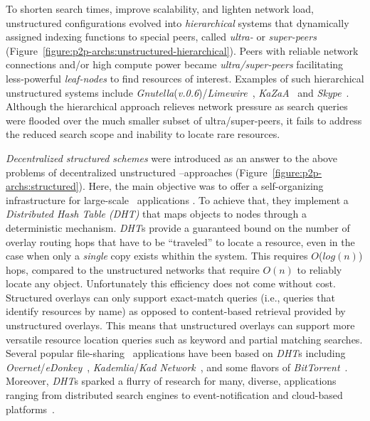 
To shorten search times, improve scalability, and lighten network load, 
unstructured configurations evolved into \emph{hierarchical} systems 
that dynamically assigned indexing functions to special peers, 
called \emph{ultra-}  or \emph{super-peers} 
(Figure~\ref{figure:p2p-archs:unstructured-hierarchical}). 
Peers with reliable network connections and/or high compute power 
became \emph{ultra/super-peers}
facilitating less-powerful \emph{leaf-nodes} to find resources of
interest. 
Examples of such hierarchical unstructured systems include
{\sl Gnutella}(\emph{v.0.6})/{\sl Limewire}~\cite{gnutella}, 
{\sl KaZaA}~\cite{kazaa} and {\sl Skype}~\cite{skype}. 
Although the hierarchical approach relieves network pressure as
search queries were flooded over the much smaller subset of 
ultra/super-peers, it fails to address the reduced search scope and
inability to locate rare resources.

\emph{Decentralized structured schemes} were introduced as an answer to the above
problems of decentralized unstructured \p--approaches
(Figure~\ref{figure:p2p-archs:structured}).
Here, the main objective was to offer 
a self-organizing infrastructure for large-scale \p\ applications
\cite{ratnasamy_can_2001,stoica_chord_2001,antony_pastry_2001,zhao_tapestry_2001,maymounkov_kademlia_2002,rgrk_bamboo_2004}.
To achieve that, they implement a \emph{Distributed Hash Table (DHT)} that maps
objects to nodes through a deterministic mechanism. \emph{DHT}s provide a
guaranteed bound on the number of overlay routing hops that have to be
``traveled'' to locate a resource, even in the case when only a \emph{single}
copy exists whithin the system. This requires
$O$($log(n)$) hops, compared to the unstructured networks that require
$O(n)$ to reliably locate any object. Unfortunately this efficiency does not
come without cost. Structured overlays can only support exact-match queries 
(i.e., queries that identify resources by name) as opposed
to content-based retrieval provided by unstructured overlays. 
This means that unstructured overlays can support more versatile 
resource location queries such as keyword and partial matching searches. 
Several popular file-sharing \p\ applications have been based on \emph{DHT}s
including {\sl Overnet}/{\sl eDonkey}~\cite{overnet}, 
{\sl Kademlia}/{\sl Kad Network}~\cite{maymounkov_kademlia_2002},  and 
some flavors of {\sl BitTorrent}~\cite{c_bittorrent_2003}.  
Moreover, \emph{DHT}s sparked
a flurry of research for many, diverse, applications ranging
from distributed search engines to event-notification and cloud-based
platforms~\cite{kbc_oceanstore_2000,rkcd_scribe_2001,mgpj_cloudsnap_2011}.

